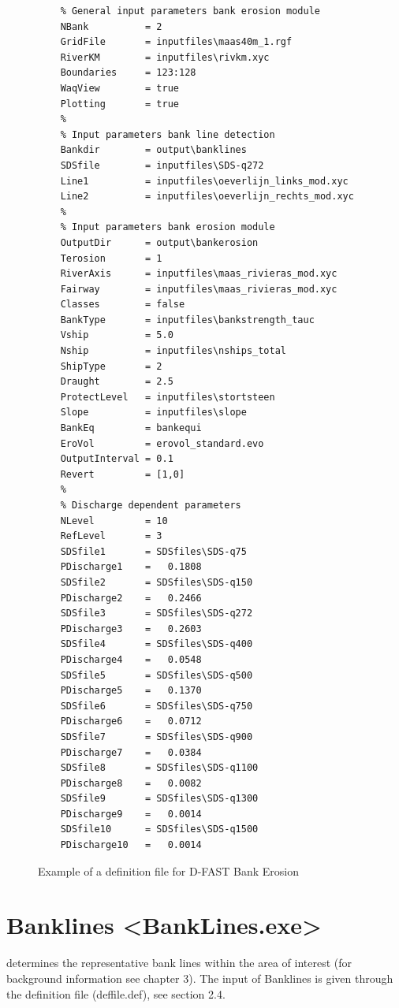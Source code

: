 \begin{figure}
\begin{verbatim}
    % General input parameters bank erosion module
    NBank          = 2
    GridFile       = inputfiles\maas40m_1.rgf
    RiverKM        = inputfiles\rivkm.xyc
    Boundaries     = 123:128
    WaqView        = true
    Plotting       = true
    %
    % Input parameters bank line detection
    Bankdir        = output\banklines
    SDSfile        = inputfiles\SDS-q272
    Line1          = inputfiles\oeverlijn_links_mod.xyc
    Line2          = inputfiles\oeverlijn_rechts_mod.xyc
    %
    % Input parameters bank erosion module
    OutputDir      = output\bankerosion
    Terosion       = 1
    RiverAxis      = inputfiles\maas_rivieras_mod.xyc
    Fairway        = inputfiles\maas_rivieras_mod.xyc
    Classes        = false
    BankType       = inputfiles\bankstrength_tauc
    Vship          = 5.0
    Nship          = inputfiles\nships_total
    ShipType       = 2
    Draught        = 2.5
    ProtectLevel   = inputfiles\stortsteen
    Slope          = inputfiles\slope
    BankEq         = bankequi
    EroVol         = erovol_standard.evo
    OutputInterval = 0.1
    Revert         = [1,0]
    %
    % Discharge dependent parameters
    NLevel         = 10
    RefLevel       = 3
    SDSfile1       = SDSfiles\SDS-q75
    PDischarge1    =   0.1808
    SDSfile2       = SDSfiles\SDS-q150
    PDischarge2    =   0.2466
    SDSfile3       = SDSfiles\SDS-q272
    PDischarge3    =   0.2603
    SDSfile4       = SDSfiles\SDS-q400
    PDischarge4    =   0.0548
    SDSfile5       = SDSfiles\SDS-q500
    PDischarge5    =   0.1370
    SDSfile6       = SDSfiles\SDS-q750
    PDischarge6    =   0.0712
    SDSfile7       = SDSfiles\SDS-q900
    PDischarge7    =   0.0384
    SDSfile8       = SDSfiles\SDS-q1100
    PDischarge8    =   0.0082
    SDSfile9       = SDSfiles\SDS-q1300
    PDischarge9    =   0.0014
    SDSfile10      = SDSfiles\SDS-q1500
    PDischarge10   =   0.0014
\end{verbatim}
\caption{Example of a definition file for D-FAST Bank Erosion}
\label{Fig2.1}
\end{figure}

\section{Banklines <BankLines.exe>}

determines the representative bank lines within the area of interest (for background information see chapter 3).
The input of Banklines is given through the definition file (deffile.def), see section 2.4.

